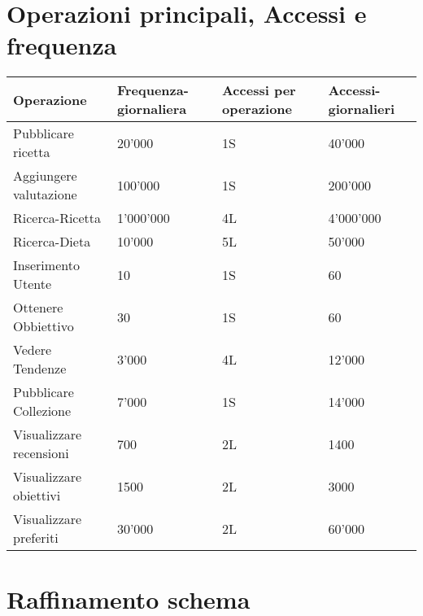 ﻿\documentclass[a4paper,12pt]{report}
\begin{document}
\section{Operazioni principali, Accessi e frequenza}
\begin{table}[H]
    \center
        \begin{tabular}{ |p{1.7in}|p{0.8in}|p{1.4in}|p{1.4in}| }
            \hline
            Operazione  & Frequenza-giornaliera  & Accessi per operazione & Accessi-giornalieri\\
            \hline
            Pubblicare ricetta   & 20'000   & 1S & 40'000 \\
            Aggiungere valutazione  &100'000  & 1S & 200'000   \\
            Ricerca-Ricetta   & 1'000'000  & 4L & 4'000'000    \\
            Ricerca-Dieta  & 10'000 & 5L &  50'000\\
            Inserimento Utente & 10& 1S & 60\\
            Ottenere Obbiettivo & 30 & 1S & 60\\
            Vedere Tendenze & 3'000& 4L &12'000\\
            Pubblicare Collezione & 7'000& 1S &14'000 \\
            Visualizzare recensioni & 700 & 2L & 1400 \\
            Visualizzare obiettivi & 1500 & 2L & 3000 \\
            Visualizzare preferiti & 30'000 & 2L & 60'000 \\
            \hline
        \end{tabular}  
    \end{table}
\section{Raffinamento schema}
\end{document}
